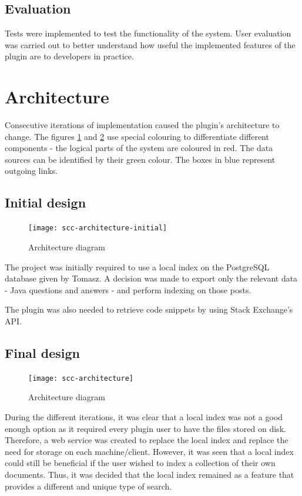 \documentclass{l4proj}
\begin{document}
\subsection{Evaluation}
Tests were implemented to test the functionality of the system. User evaluation was carried out to better understand how useful the implemented features of the plugin are to developers in practice. 

\section{Architecture}
Consecutive iterations of implementation caused the plugin's architecture to change. The figures \ref{fig:architecture-initial} and \ref{fig:architecture} use special colouring to differentiate different components - the logical parts of the system are coloured in red. The data sources can be identified by their green colour. The boxes in blue represent outgoing links.

\subsection{Initial design}

\begin{figure}[H]
\texttt{[image: scc-architecture-initial]}
\centering
\caption{Architecture diagram}\label{scc-architecture-initial}
\label{fig:architecture-initial}
\end{figure}

The project was initially required to use a local index on the PostgreSQL database given by Tomasz. A decision was made to export only the relevant data - Java questions and answers - and perform indexing on those posts. 

The plugin was also needed to retrieve code snippets by using Stack Exchange's API. 

\subsection{Final design}

\begin{figure}[H]
\texttt{[image: scc-architecture]}
\centering
\caption{Architecture diagram}
\label{fig:architecture}
\end{figure}

During the different iterations, it was clear that a local index was not a good enough option as it required every plugin user to have the files stored on disk. Therefore, a web service was created to replace the local index and replace the need for storage on each machine/client. However, it was seen that a local index could still be beneficial if the user wished to index a collection of their own documents. Thus, it was decided that the local index remained as a feature that provides a different and unique type of search.
\end{document}
